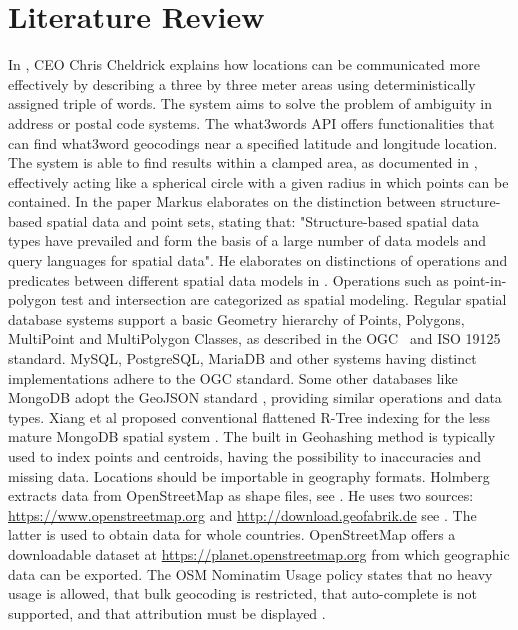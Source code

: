 \section{Literature Review}
In \cite{w3w}, CEO Chris Cheldrick explains how locations can be communicated more effectively by describing a three by three meter areas using deterministically assigned triple of words. The system aims to solve the problem of ambiguity in address or postal code systems. The what3words API offers functionalities that can find what3word geocodings near a specified latitude and longitude location. The system is able to find results within a clamped area, as documented in \cite{w3w-api}, effectively acting like a spherical circle with a given radius in which points can be contained. In the paper \cite{spatial-data-types} Markus elaborates on the distinction between structure-based spatial data and point sets, stating that: "Structure-based spatial data types have prevailed and form the basis of a large number of data models and query languages for spatial data". He elaborates on distinctions of operations and predicates between different spatial data models in \cite{geometry}. Operations such as point-in-polygon test and intersection are categorized as spatial modeling. Regular spatial database systems support a basic Geometry hierarchy of Points, Polygons, MultiPoint and MultiPolygon Classes, as described in the OGC~\cite{SFA} and ISO 19125~\cite{ISO-19125} standard. MySQL, PostgreSQL, MariaDB and other systems having distinct implementations adhere to the OGC standard. Some other databases like MongoDB adopt the GeoJSON standard \cite{MongoDB-GeoJSON}, providing similar operations and data types. Xiang et al proposed conventional flattened R-Tree indexing for the less mature MongoDB spatial system \cite{MongoDB-implementation}. The built in Geohashing method is typically used to index points and centroids, having the possibility to inaccuracies and missing data. Locations should be importable in geography formats. Holmberg extracts data from OpenStreetMap as shape files, see \cite[Chapter~6]{openstreetmap}. He uses two sources: \url{https://www.openstreetmap.org} and \url{http://download.geofabrik.de} see \cite[Chapter~7.3]{openstreetmap}. The latter is used to obtain data for whole countries. OpenStreetMap offers a downloadable dataset at \url{https://planet.openstreetmap.org} from which geographic data can be exported.
The OSM Nominatim Usage policy states that no heavy usage is allowed, that bulk geocoding is restricted, that auto-complete is not supported, and that attribution must be displayed \cite{OSM-policy}.

